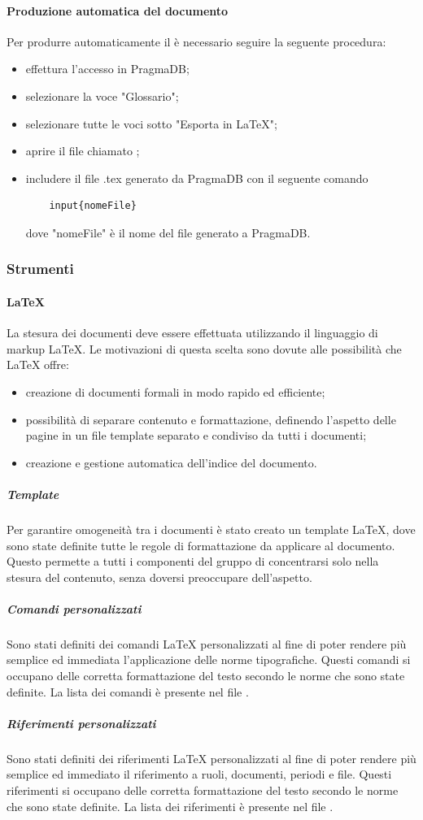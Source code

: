 \paragraph{Produzione automatica del documento \Gldoc}
Per produrre automaticamente il \Gldoc è necessario seguire la seguente procedura:
\begin{itemize}
	\item effettura l'accesso in PragmaDB;
	\item selezionare la voce "Glossario";
	\item selezionare tutte le voci sotto "Esporta in \LaTeX";
	\item aprire il file chiamato \Glfile;
	\item includere il file .tex generato da PragmaDB con il seguente comando
	\begin{verbatim}
	input{nomeFile}
	\end{verbatim}
	dove "nomeFile" è il nome del file generato a PragmaDB.
\end{itemize}
\subsubsection{Strumenti}
\label{sec:Strumenti}
 \paragraph{\LaTeX{}}
La stesura dei documenti deve essere effettuata utilizzando il linguaggio di markup \LaTeX{}. Le motivazioni di questa scelta sono dovute alle possibilità che \LaTeX{}{} offre:
\begin{itemize}
	\item creazione di documenti formali in modo rapido ed efficiente;
	\item possibilità di separare contenuto e formattazione, definendo l'aspetto delle pagine in un file
template separato e condiviso da tutti i documenti;
	\item creazione e gestione automatica dell'indice del documento.
\end{itemize}
\subparagraph{Template}
Per garantire omogeneità tra i documenti è stato creato un template \LaTeX{}, dove sono state definite tutte le regole di formattazione da applicare al documento. Questo permette a tutti i componenti del gruppo di concentrarsi solo nella stesura del contenuto, senza doversi preoccupare dell'aspetto.
\subparagraph{Comandi personalizzati}
Sono stati definiti dei comandi \LaTeX{} personalizzati al fine di poter rendere più semplice ed immediata
l’applicazione delle norme tipografiche. Questi comandi si occupano delle
corretta formattazione del testo secondo le norme che sono state definite. La
lista dei comandi è presente nel file .
\subparagraph{Riferimenti personalizzati}
Sono stati definiti dei riferimenti \LaTeX{} personalizzati al fine di poter rendere più semplice ed immediato
il riferimento a ruoli, documenti, periodi e file. Questi riferimenti si occupano delle
corretta formattazione del testo secondo le norme che sono state definite. La
lista dei riferimenti è presente nel file .
